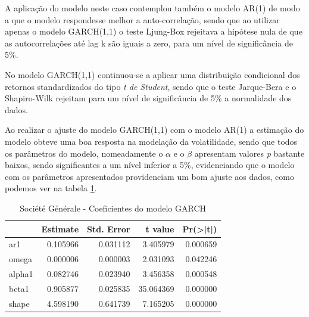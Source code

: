\documentclass[
  12pt,
  a4paper,
  openany]{book}
\newenvironment{Shaded}{\begin{snugshade}}{\end{snugshade}}
\newcommand{\AttributeTok}[1]{\textcolor[rgb]{0.77,0.63,0.00}{#1}}
\newcommand{\CommentTok}[1]{\textcolor[rgb]{0.56,0.35,0.01}{\textit{#1}}}
\newcommand{\ConstantTok}[1]{\textcolor[rgb]{0.00,0.00,0.00}{#1}}
\newcommand{\DecValTok}[1]{\textcolor[rgb]{0.00,0.00,0.81}{#1}}
\newcommand{\FunctionTok}[1]{\textcolor[rgb]{0.00,0.00,0.00}{#1}}
\newcommand{\NormalTok}[1]{#1}
\newcommand{\OtherTok}[1]{\textcolor[rgb]{0.56,0.35,0.01}{#1}}
\newcommand{\SpecialCharTok}[1]{\textcolor[rgb]{0.00,0.00,0.00}{#1}}
\newcommand{\StringTok}[1]{\textcolor[rgb]{0.31,0.60,0.02}{#1}}
\theoremstyle{definition}
\theoremstyle{definition}
\theoremstyle{definition}
\theoremstyle{remark}
\begin{document}
A aplicação do modelo neste caso contemplou também o modelo AR(1) de modo a que o modelo respondesse melhor a auto-correlação, sendo que ao utilizar apenas o modelo GARCH(1,1) o teste Ljung-Box rejeitava a hipótese nula de que as autocorrelações até lag k são iguais a zero, para um nível de significância de 5\%.

No modelo GARCH(1,1) continuou-se a aplicar uma distribuição condicional dos retornos standardizados do tipo \emph{t de Student}, sendo que o teste Jarque-Bera e o Shapiro-Wilk rejeitam para um nível de significância de 5\% a normalidade dos dados.

Ao realizar o ajuste do modelo GARCH(1,1) com o modelo AR(1) a estimação do modelo obteve uma boa resposta na modelação da volatilidade, sendo que todos os parâmetros do modelo, nomeadamente o \(\alpha\) e o \(\beta\) apresentam valores \emph{p} bastante baixos, sendo significantes a um nível inferior a 5\%, evidenciando que o modelo com os parâmetros apresentados providenciam um bom ajuste aos dados, como podemos ver na tabela \ref{tab:GLEcoefk}.

\scriptsize

\begin{Shaded}
\end{Shaded}

\normalsize

\begin{table}[!h]

\caption{\label{tab:GLEcoefk}Société Générale - Coeficientes do modelo GARCH}
\centering
\begin{tabular}[t]{lrrrr}
\toprule
  &  Estimate &  Std. Error &  t value & Pr(>|t|)\\
\midrule
ar1 & 0.105966 & 0.031112 & 3.405979 & 0.000659\\
omega & 0.000006 & 0.000003 & 2.031093 & 0.042246\\
alpha1 & 0.082746 & 0.023940 & 3.456358 & 0.000548\\
beta1 & 0.905877 & 0.025835 & 35.064369 & 0.000000\\
shape & 4.598190 & 0.641739 & 7.165205 & 0.000000\\
\bottomrule
\end{tabular}
\end{table}
\FloatBarrier
\centering
\end{document}
